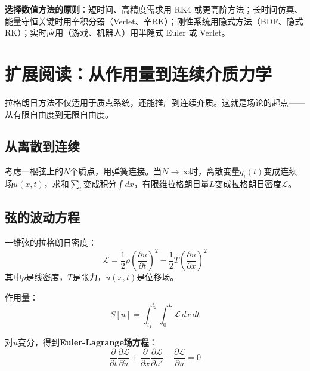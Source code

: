 \begin{insightbox}
\textbf{选择数值方法的原则}：短时间、高精度需求用 RK4 或更高阶方法；长时间仿真、能量守恒关键时用辛积分器（Verlet、辛RK）；刚性系统用隐式方法（BDF、隐式RK）；实时应用（游戏、机器人）用半隐式 Euler 或 Verlet。
\end{insightbox}

\section*{扩展阅读：从作用量到连续介质力学}

拉格朗日方法不仅适用于质点系统，还能推广到连续介质。这就是场论的起点——从有限自由度到无限自由度。

\subsection*{从离散到连续}

考虑一根弦上的$N$个质点，用弹簧连接。当$N \to \infty$时，离散变量$q_i(t)$变成连续场$u(x,t)$，求和$\sum_i$变成积分$\int dx$，有限维拉格朗日量$L$变成拉格朗日密度$\mathcal{L}$。

\subsection*{弦的波动方程}

一维弦的拉格朗日密度：
\begin{equation}
\mathcal{L} = \frac{1}{2}\rho \left(\frac{\partial u}{\partial t}\right)^2 - \frac{1}{2}T\left(\frac{\partial u}{\partial x}\right)^2
\end{equation}
其中$\rho$是线密度，$T$是张力，$u(x,t)$是位移场。

作用量：
\begin{equation}
S[u] = \int_{t_1}^{t_2} \int_0^L \mathcal{L} \, dx \, dt
\end{equation}

对$u$变分，得到\textbf{Euler-Lagrange场方程}：
\begin{equation}
\frac{\partial}{\partial t}\frac{\partial \mathcal{L}}{\partial \dot{u}} + \frac{\partial}{\partial x}\frac{\partial \mathcal{L}}{\partial u'} - \frac{\partial \mathcal{L}}{\partial u} = 0
\end{equation}

